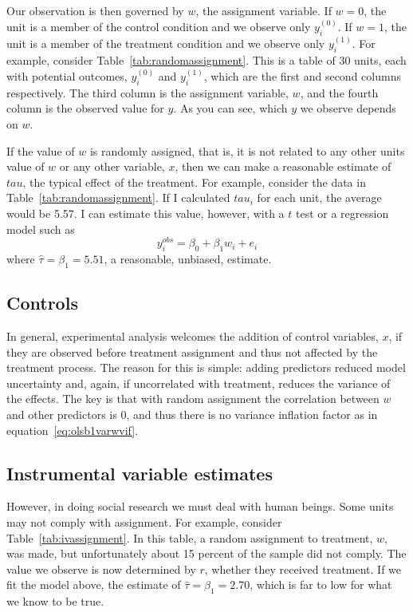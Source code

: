 Our observation is then governed by $w$, the assignment variable. If $w=0$, the unit is a member of the control condition and we observe only $y_i^{\left(0\right)}$. If $w=1$, the unit is a member of the treatment condition and we observe only $y_i^{\left(1\right)}$. For example, consider Table~\ref{tab:randomassignment}. This is a table of 30 units, each with potential outcomes, $y_i^{\left(0\right)}$ and $y_i^{\left(1\right)}$, which are the first and second columns respectively. The third column is the assignment variable, $w$, and the fourth column is the observed value for $y$. As you can see, which $y$ we observe depends on $w$.

If the value of $w$ is randomly assigned, that is, it is not related to any other units value of $w$ or any other variable, $x$, then we can make a reasonable estimate of $tau$, the typical effect of the treatment. For example, consider the data in Table~\ref{tab:randomassignment}. If I calculated $tau_i$ for each unit, the average would be 5.57. I can estimate this value, however, with a $t$ test or a regression model such as
\[
y_i^{obs} = \beta_0 + \beta_1w_i+e_i
\]
where $\hat{\tau}=\beta_1=5.51$, a reasonable, unbiased, estimate.

\subsection{Controls}

In general, experimental analysis welcomes the addition of control variables, $x$, if they are observed before treatment assignment and thus not affected by the treatment process. The reason for this is simple: adding predictors reduced model uncertainty and, again, if uncorrelated with treatment, reduces the variance of the effects. The key is that with random assignment the correlation between $w$ and other predictors is 0, and thus there is no variance inflation factor as in equation~\eqref{eq:olsb1varwvif}.

\subsection{Instrumental variable estimates}

However, in doing social research we must deal with human beings. Some units may not comply with assignment. For example, consider Table~\ref{tab:ivassignment}. In this table, a random assignment to treatment, $w$, was made, but unfortunately about 15 percent of the sample did not comply. The value we observe is now determined by $r$, whether they received treatment. If we fit the model above, the estimate of $\hat{\tau}=\beta_1=2.70$, which is far to low for what we know to be true.


